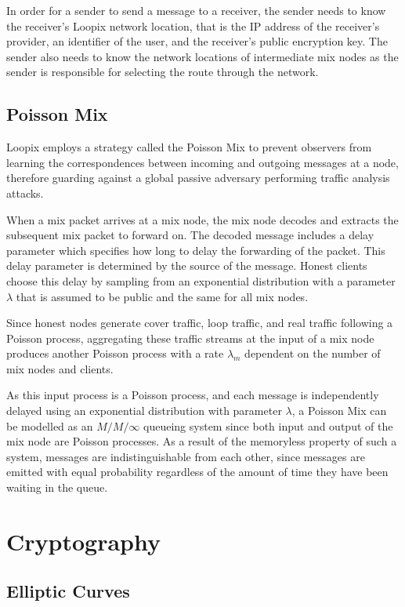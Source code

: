 \documentclass[final,dissertation.tex]{subfiles}
\begin{document}
In order for a sender to send a message to a receiver, the sender needs to know the receiver's Loopix network location, that is the IP address of the receiver's provider, an identifier of the user, and the receiver's public encryption key. The sender also needs to know the network locations of intermediate mix nodes as the sender is responsible for selecting the route through the network.


\subsection{Poisson Mix}

Loopix employs a strategy called the Poisson Mix to prevent observers from learning the correspondences between incoming and outgoing messages at a node, therefore guarding against a global passive adversary performing traffic analysis attacks. 

When a mix packet arrives at a mix node, the mix node decodes and extracts the subsequent mix packet to forward on. The decoded message includes a delay parameter which specifies how long to delay the forwarding of the packet. This delay parameter is determined by the source of the message. Honest clients choose this delay by sampling from an exponential distribution with a parameter $\lambda$ that is assumed to be public and the same for all mix nodes.

Since honest nodes generate cover traffic, loop traffic, and real traffic following a Poisson process, aggregating these traffic streams at the input of a mix node produces another Poisson process with a rate $\lambda_m$ dependent on the number of mix nodes and clients.

As this input process is a Poisson process, and each message is independently delayed using an exponential distribution with parameter $\lambda$, a Poisson Mix can be modelled as an $M/M/\infty$ queueing system since both input and output of the mix node are Poisson processes. As a result of the memoryless property of such a system, messages are indistinguishable from each other, since messages are emitted with equal probability regardless of the amount of time they have been waiting in the queue.

\section{Cryptography}

\subsection{Elliptic Curves}
\end{document}
